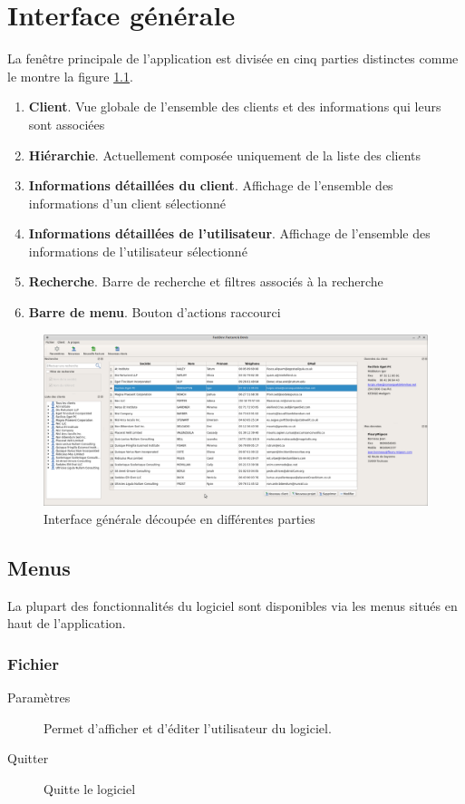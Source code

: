 \chapter{Interface générale}
La fenêtre principale de l'application est divisée en cinq parties distinctes comme le montre la figure \ref{fig:ihmClients}. 

\begin{enumerate}
	\item \textbf{Client}. Vue globale de l'ensemble des clients et des informations qui leurs sont associées	
	\item \textbf{Hiérarchie}. Actuellement composée uniquement de la liste des clients
	\item \textbf{Informations détaillées du client}. Affichage de l'ensemble des informations d’un client sélectionné
	\item \textbf{Informations détaillées de l'utilisateur}. Affichage de l'ensemble des informations de l'utilisateur sélectionné 
	\item \textbf{Recherche}. Barre de recherche et filtres associés à la recherche
	\item \textbf{Barre de menu}. Bouton d’actions raccourci
\end{enumerate}

\begin{figure}[H]
	\centering
	\includegraphics[width=15cm]{screens/ihmClients.png}
	\caption{Interface générale découpée en différentes parties}
	\label{fig:ihmClients}
\end{figure}

\section{Menus}
La plupart des fonctionnalités du logiciel sont disponibles via les menus situés en haut de l’application. 

\subsection{Fichier}
	\begin{description}
		\item[Paramètres] Permet d'afficher et d’éditer l’utilisateur du logiciel.
		\item[Quitter] Quitte le logiciel
	\end{description}
